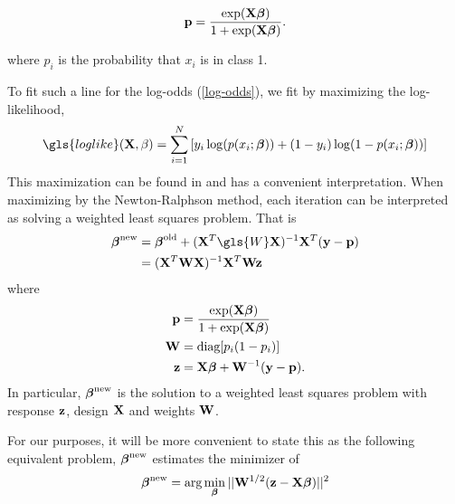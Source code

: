 \documentclass[main.tex]{subfiles}
\begin{document}
\begin{align}
	\mathbf{p} = \dfrac{\text{exp}(\mathbf{X} \boldsymbol \beta)}{1 + \text{exp}(\mathbf{X} \boldsymbol \beta)}.
\end{align}

where $p_i$ is the probability that $x_i$ is in class 1.

To fit such a line for the log-odds (\ref{log-odds}), we fit by maximizing the log-likelihood,
\begin{align}
	\gls{loglike}(\X, \beta) = \sum_{i = 1}^N \left [ y_i \log (p(x_i; \bbeta)) + (1-y_i) \log(1 - p(x_i; \bbeta))\right ] \label{loglikelihood}
\end{align}
This maximization can be found in \citep{ESL} and has a convenient interpretation. When maximizing by the Newton-Ralphson method, each iteration can be interpreted as solving a weighted least squares problem. That is
\begin{align}
    \bbeta^{\new} &= \bbeta^{\old} + (\X^T \gls{W} \X)^{-1} \X^T(\y - \p) \\
    &= (\X^T \W \X)^{-1} \X^T \W \z
\end{align}
where
\begin{align}
	\mathbf{p} &= \dfrac{\text{exp}(\mathbf{X} \boldsymbol \beta)}{1 + \text{exp}(\mathbf{X} \boldsymbol \beta)} \label{pdef}\\
    \mathbf{W} &= \text{diag}[p_i(1-p_i)] \label{Wdef}\\
    \mathbf{z} &= \mathbf{X} \boldsymbol \beta + \mathbf{W}^{-1}(\mathbf{y} - \mathbf{p}). \label{zdef}
\end{align}
In particular, $\boldsymbol \beta^{\text{new}}$ is the solution to a weighted least squares problem with response $\mathbf{z}$, design $\mathbf{X}$ and weights $\mathbf{W}$.

For our purposes, it will be more convenient to state this as the following equivalent problem,  $\boldsymbol \beta^{\text{new}}$ estimates the minimizer of
\begin{align}
    \boldsymbol \beta^{\text{new}} =  \text{arg} \min_{\boldsymbol \beta} ||\mathbf{W}^{1/2}(\mathbf{z} - \mathbf{X} \boldsymbol \beta)||^2
\end{align}
\end{document}
